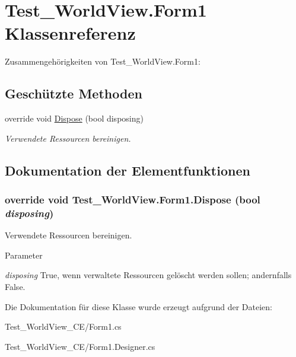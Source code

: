 \hypertarget{class_test___world_view_1_1_form1}{
\section{Test\_\-WorldView.Form1 Klassenreferenz}
\label{class_test___world_view_1_1_form1}
}


Zusammengehörigkeiten von Test\_\-WorldView.Form1:\subsection*{Geschützte Methoden}
\begin{DoxyCompactItemize}
\item 
override void \hyperlink{class_test___world_view_1_1_form1_aeb423a166a4e2a2273b5b825f12ecc2d}{Dispose} (bool disposing)
\begin{DoxyCompactList}\small\item\em Verwendete Ressourcen bereinigen. \item\end{DoxyCompactList}\end{DoxyCompactItemize}


\subsection{Dokumentation der Elementfunktionen}
\hypertarget{class_test___world_view_1_1_form1_aeb423a166a4e2a2273b5b825f12ecc2d}{
\subsubsection[{Dispose}]{\setlength{\rightskip}{0pt plus 5cm}override void Test\_\-WorldView.Form1.Dispose (bool {\em disposing})}}
\label{class_test___world_view_1_1_form1_aeb423a166a4e2a2273b5b825f12ecc2d}


Verwendete Ressourcen bereinigen. 


\begin{DoxyParams}{Parameter}
\item[{\em disposing}]True, wenn verwaltete Ressourcen gelöscht werden sollen; andernfalls False.\end{DoxyParams}


Die Dokumentation für diese Klasse wurde erzeugt aufgrund der Dateien:\begin{DoxyCompactItemize}
\item 
Test\_\-WorldView\_\-CE/Form1.cs\item 
Test\_\-WorldView\_\-CE/Form1.Designer.cs\end{DoxyCompactItemize}
